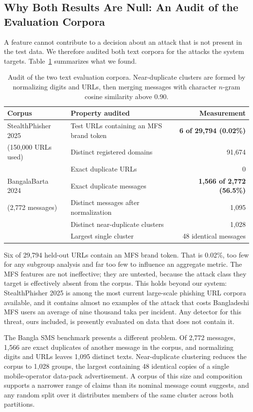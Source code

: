 \documentclass[manuscript,screen,review]{acmart}
\begin{document}
\subsection{Why Both Results Are Null: An Audit of the Evaluation Corpora}
A feature cannot contribute to a decision about an attack that is not present in the test data. We therefore audited both text corpora for the attacks the system targets. Table~\ref{tab:audit} summarizes what we found.

\begin{table}[t]
\centering
\caption{Audit of the two text evaluation corpora. Near-duplicate clusters are formed by normalizing digits and URLs, then merging messages with character $n$-gram cosine similarity above 0.90.}
\label{tab:audit}
\small
\begin{tabular}{llr}
\toprule
Corpus & Property audited & Measurement \\
\midrule
StealthPhisher 2025 & Test URLs containing an MFS brand token & \textbf{6 of 29{,}794 (0.02\%)} \\
(150{,}000 URLs used) & Distinct registered domains & 91{,}674 \\
 & Exact duplicate URLs & 0 \\
BangalaBarta 2024 & Exact duplicate messages & \textbf{1{,}566 of 2{,}772 (56.5\%)} \\
(2{,}772 messages) & Distinct messages after normalization & 1{,}095 \\
 & Distinct near-duplicate clusters & 1{,}028 \\
 & Largest single cluster & 48 identical messages \\
\bottomrule
\end{tabular}
\end{table}

Six of 29{,}794 held-out URLs contain an MFS brand token. That is 0.02\%, too few for any subgroup analysis and far too few to influence an aggregate metric. The MFS features are not ineffective; they are untested, because the attack class they target is effectively absent from the corpus. This holds beyond our system: StealthPhisher 2025 is among the most current large-scale phishing URL corpora available, and it contains almost no examples of the attack that costs Bangladeshi MFS users an average of nine thousand taka per incident. Any detector for this threat, ours included, is presently evaluated on data that does not contain it.

The Bangla SMS benchmark presents a different problem. Of 2{,}772 messages, 1{,}566 are exact duplicates of another message in the corpus, and normalizing digits and URLs leaves 1{,}095 distinct texts. Near-duplicate clustering reduces the corpus to 1{,}028 groups, the largest containing 48 identical copies of a single mobile-operator data-pack advertisement. A corpus of this size and composition supports a narrower range of claims than its nominal message count suggests, and any random split over it distributes members of the same cluster across both partitions.
\end{document}
